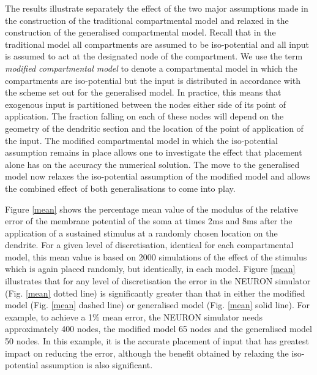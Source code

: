 The results illustrate separately the effect of the two major
assumptions made in the construction of the traditional
compartmental model and relaxed in the construction of the
generalised compartmental model. Recall that in the traditional
model all compartments are assumed to be iso-potential and all
input is assumed to act at the designated node of the compartment.
We use the term \emph{modified compartmental model} to denote a
compartmental model in which the compartments are iso-potential
but the input is distributed in accordance with the scheme set out
for the generalised model. In practice, this means that exogenous
input is partitioned between the nodes either side of its point of
application. The fraction falling on each of these nodes will
depend on the geometry of the dendritic section and the location
of the point of application of the input. The modified
compartmental model in which the iso-potential assumption remains
in place allows one to investigate the effect that placement alone
has on the accuracy the numerical solution. The move to the
generalised model now relaxes the iso-potential assumption of the
modified model and allows the combined effect of both
generalisations to come into play.

Figure \ref{mean} shows the percentage mean value of the modulus
of the relative error of the membrane potential of the soma at
times 2ms and 8ms after the application of a sustained stimulus at
a randomly chosen location on the dendrite. For a given level of
discretisation, identical for each compartmental model, this mean
value is based on 2000 simulations of the effect of the stimulus
which is again placed randomly, but identically, in each model.
Figure \ref{mean} illustrates that for any level of discretisation
the error in the NEURON simulator (Fig. \ref{mean} dotted line) is
significantly greater than that in either the modified model (Fig.
\ref{mean} dashed line) or generalised model (Fig. \ref{mean}
solid line). For example, to achieve a 1\% mean error, the NEURON
simulator needs approximately 400 nodes, the modified model 65
nodes and the generalised model 50 nodes. In this example, it is
the accurate placement of input that has greatest impact on
reducing the error, although the benefit obtained by relaxing the
iso-potential assumption is also significant.

